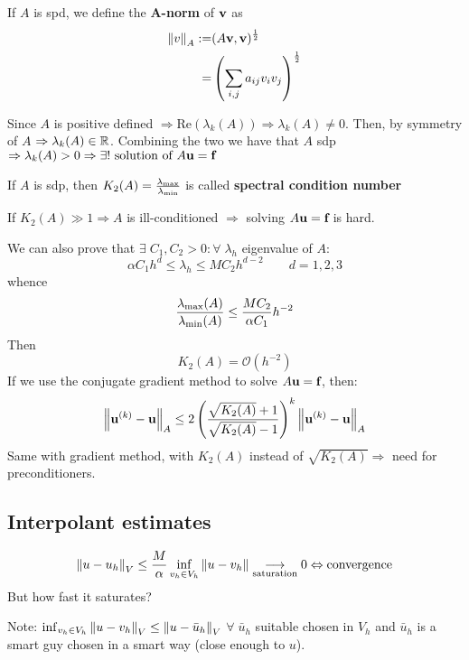 \begin{definition}
    If \(A\) is spd, we define the \textbf{A-norm} of \(\textbf{v}\) as 
    \begin{align*}
        \norm{v}_A :=& (A\textbf{v}, \textbf{v})^{\frac{1}{2}}\\
        =& \left(\sum_{i,j}a_{ij} v_i v_j\right)^{\frac{1}{2}}
    \end{align*}
\end{definition}
Since \(A\) is positive defined \(\Rightarrow \text{Re}(\lambda_k(A)) \Rightarrow \lambda_k(A) \neq 0\). Then, by symmetry of \(A\) \(\Rightarrow \lambda_k(A) \in \mathbb{R}\). Combining the two we have that \(A\) sdp \(\Rightarrow \lambda_k (A) > 0 \Rightarrow \exists! \text{ solution of } A\textbf{u} = \textbf{f}\)
\begin{definition}
    If \(A\) is sdp, then \(K_2(A) = \frac{\lambda_{\text{max}}}{\lambda_{\text{min}}}\) is called \textbf{spectral condition number}
\end{definition}
If \(K_2(A) \gg 1 \Rightarrow A\) is ill-conditioned \(\Rightarrow\) solving \(A\textbf{u} = \textbf{f}\) is hard.

We can also prove that \(\exists \; C_1, C_2 > 0 : \forall \; \lambda_h\) eigenvalue of \(A\): 
\[
    \alpha C_1 h^d \leq \lambda_h \leq M C_2 h^{d-2} \qquad d = 1, 2, 3
\]
whence 
\[
    \frac{\lambda_{\text{max}}(A)}{\lambda_{\text{min}}(A)} \leq \frac{MC_2}{\alpha C_1} h^{-2}
\]
Then
\[
    K_2(A) = \mathcal{O}(h^{-2})
\]
If we use the conjugate gradient method to solve \(A\textbf{u} = \textbf{f}\), then:
\[
    \norm{\textbf{u}^{(k)} - \textbf{u}}_A \leq 2\left(\frac{\sqrt{K_2(A)}+1}{\sqrt{K_2(A)}-1}\right)^k \norm{\textbf{u}^{(k)} - \textbf{u}}_A
\]
Same with gradient method, with \(K_2(A)\) instead of \(\sqrt{K_2(A)} \Rightarrow\) need for preconditioners.
\subsection{Interpolant estimates}
\begin{equation}
    \norm{u-u_h}_V \leq \frac{M}{\alpha} \inf_{v_h \in V_h} \norm{u-v_h} \underset{\text{saturation}}{\longrightarrow} 0 \Leftrightarrow \text{convergence} 
\end{equation}
But how fast it saturates? 

Note: \(\inf_{v_h \in V_h} \norm{u-v_h}_V \leq \norm{u-\bar{u}_h}_V\) \(\forall \; \bar{u}_h\) suitable chosen in \(V_h\) and \(\bar{u}_h\) is a smart guy chosen in a smart way (close enough to \(u\)). 


